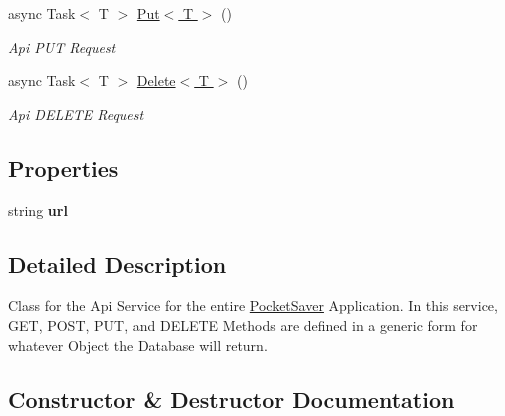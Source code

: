 \begin{DoxyCompactItemize}
async Task$<$ T $>$ \hyperlink{class_pocket_saver_1_1_services_1_1_api_s_v_addfb96abb14d6189ad11040354540e08}{Put$<$ T $>$} ()
\begin{DoxyCompactList}\small\item\em Api P\+UT Request \end{DoxyCompactList}\item 
async Task$<$ T $>$ \hyperlink{class_pocket_saver_1_1_services_1_1_api_s_v_a1a4b1d8cc442dc1bcb908ff2ae7b243f}{Delete$<$ T $>$} ()
\begin{DoxyCompactList}\small\item\em Api D\+E\+L\+E\+TE Request \end{DoxyCompactList}\end{DoxyCompactItemize}
\subsection*{Properties}
\begin{DoxyCompactItemize}
\item 
\mbox{\label{class_pocket_saver_1_1_services_1_1_api_s_v_a61c115b80ecb71b84cd31052aa876e4e}} 
string {\bfseries url}
\end{DoxyCompactItemize}


\subsection{Detailed Description}
Class for the Api Service for the entire \hyperlink{namespace_pocket_saver}{Pocket\+Saver} Application. In this service, G\+ET, P\+O\+ST, P\+UT, and D\+E\+L\+E\+TE Methods are defined in a generic form for whatever Object the Database will return. 



\subsection{Constructor \& Destructor Documentation}
\mbox{\label{class_pocket_saver_1_1_services_1_1_api_s_v_ab265e3f79436f302dde76459b6fefa46}} 
